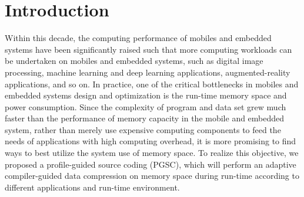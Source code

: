 \documentclass[]{article}
\begin{document}
\maketitle


\section{Introduction}
Within this decade, the computing performance of mobiles and embedded systems have been significantly raised such that more computing workloads can be undertaken on mobiles and embedded systems, such as digital image processing, machine learning and deep learning applications, augmented-reality applications, and so on. In practice, one of the critical bottlenecks in mobiles and embedded systems design and optimization is the run-time memory space and power consumption. Since the complexity of program and data set grew much faster than the performance of memory capacity in the mobile and embedded system, rather than merely use expensive computing components to feed the needs of applications with high computing overhead, it is more promising to find ways to best utilize the system use of memory space. To realize this objective, we proposed a profile-guided source coding (PGSC), which will perform an adaptive compiler-guided data compression on memory space during run-time according to different applications and run-time environment. \par 
\end{document}
